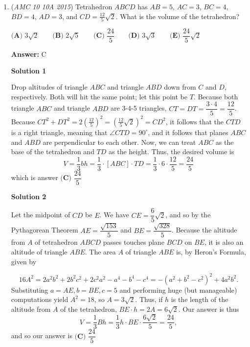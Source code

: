 \begin{enumerate}
 Our answer is then $\boxed{B}$.

 Note: The original problem only stated that $A$ and $P$ were positive integers, not the side lengths themselves. This rendered the problem unsolvable, and so the AMC awarded everyone 6 points on this problem. This wiki has the corrected version of the problem so that the 2015 AMC 10A test can be used for practice.

 


	\item (\textit{AMC 10 10A 2015}) Tetrahedron $ABCD$ has $AB=5$, $AC=3$, $BC=4$, $BD=4$, $AD=3$, and $CD=\frac{12}5\sqrt2$.  What is the volume of the tetrahedron?


 $\textbf{(A) }3\sqrt2\qquad\textbf{(B) }2\sqrt5\qquad\textbf{(C) }\dfrac{24}5\qquad\textbf{(D) }3\sqrt3\qquad\textbf{(E) }\dfrac{24}5\sqrt2$

 \textbf{Answer: }C



\textbf{Solution 1}

Drop altitudes of triangle $ABC$ and triangle $ABD$ down from $C$ and $D$, respectively. Both will hit the same point; let this point be $T$. Because both triangle $ABC$ and triangle $ABD$ are 3-4-5 triangles, $CT = DT = \dfrac{3\cdot4}{5} = \dfrac{12}{5}$. Because $CT^{2} + DT^{2} = 2\left(\frac{12}{5}\right)^{2} = \left(\frac{12}{5}\sqrt{2}\right)^{2} = CD^{2}$, it follows that the $CTD$ is a right triangle, meaning that $\angle CTD = 90^\circ$, and it follows that planes $ABC$ and $ABD$ are perpendicular to each other. Now, we can treat $ABC$ as the base of the tetrahedron and $TD$ as the height. Thus, the desired volume is 
 \[V = \dfrac{1}{3} bh = \dfrac{1}{3}\cdot[ABC]\cdot TD = \dfrac{1}{3} \cdot 6 \cdot \dfrac{12}{5} = \dfrac{24}{5}\] which is answer $\boxed{\textbf{(C) } \dfrac{24}{5}}$




\textbf{Solution 2}

Let the midpoint of $CD$ be $E$. We have $CE = \dfrac{6}{5} \sqrt{2}$, and so by the Pythagorean Theorem $AE = \dfrac{\sqrt{153}}{5}$ and $BE = \dfrac{\sqrt{328}}{5}$. Because the altitude from $A$ of tetrahedron $ABCD$ passes touches plane $BCD$ on $BE$, it is also an altitude of triangle $ABE$. The area $A$ of triangle $ABE$ is, by Heron's Formula, given by

 
 \[16A^2 = 2a^2 b^2 + 2b^2 c^2 + 2c^2 a^2 - a^4 - b^4 - c^4 = -(a^2 + b^2 - c^2)^2 + 4a^2 b^2.\]Substituting $a = AE, b = BE, c = 5$ and performing huge (but manageable) computations yield $A^2 = 18$, so $A = 3\sqrt{2}$. Thus, if $h$ is the length of the altitude from $A$ of the tetrahedron, $BE \cdot h = 2A = 6\sqrt{2}$. Our answer is thus
 \[V = \dfrac{1}{3} Bh = \dfrac{1}{3} h \cdot BE \cdot \dfrac{6\sqrt{2}}{5} = \dfrac{24}{5},\]and so our answer is $\boxed{\textbf{(C) } \dfrac{24}{5}}$





\end{enumerate}
